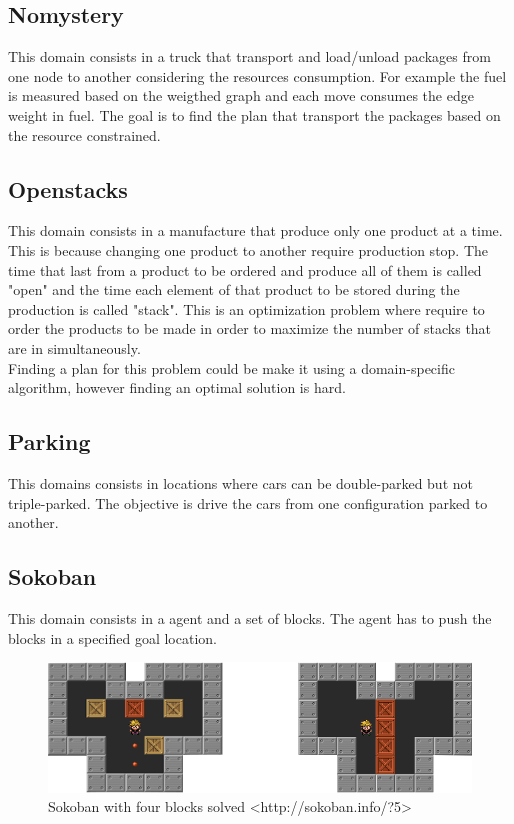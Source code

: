 \subsection{Nomystery}
This domain consists in a truck that transport and load/unload packages from one node to another considering the resources consumption. For example the fuel is measured based on the weigthed graph and each move consumes the edge weight in fuel. The goal is to find the plan that transport the packages based on the resource constrained.\\

\subsection{Openstacks}
This domain consists in a manufacture that produce only one product at a time. This is because changing one product to another require production stop. The time that last from a product to be ordered and produce all of them is called "open" and the time each element of that product to be stored during the production is called "stack". This is an optimization problem where require to order the products to be made in order to maximize the number of stacks that are in simultaneously.\\

Finding a plan for this problem could be make it using a domain-specific algorithm, however finding an optimal solution is hard.\\  

\subsection{Parking}
This domains consists in locations where cars can be double-parked but not triple-parked. The objective is drive the cars from one configuration parked to another.\\

\subsection{Sokoban}
This domain consists in a agent and a set of blocks. The agent has to push the blocks in a specified goal location.

\begin{figure}[!htb]
\begin{center}
  \includegraphics[width=12cm,scale=0.5]{images/sokoban_star_end}
\end{center}
\caption{Sokoban with four blocks solved <http://sokoban.info/?5>}\label{fig:img_sokoban_solved}
\end{figure}

